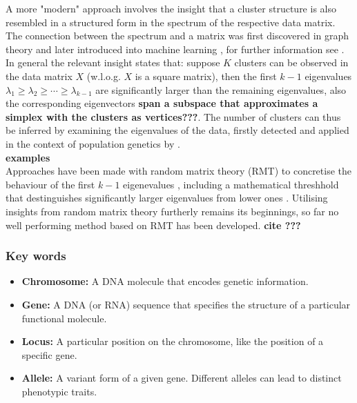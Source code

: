 \documentclass[a4paper, 11pt]{article}
\begin{document}
A more "modern" approach involves the insight that a cluster structure is also resembled in a structured form in the spectrum of the respective data matrix. The connection between the spectrum and a matrix was first discovered in graph theory \cite{donath1973lower} \cite{fiedler1973algebraic} and later introduced into machine learning \cite{shi2000normalized} \cite{meila2001random} \cite{ng2002spectral}, for further information see \cite{von2007tutorial}. In general the relevant insight states that: suppose $K$ clusters can be observed in the data matrix $X$ (w.l.o.g. $X$ is a square matrix), then the first $k-1$ eigenvalues $\lambda_1 \geq \lambda_2 \geq \cdots \geq \lambda_{k-1}$ are significantly larger than the remaining eigenvalues, also the corresponding eigenvectors \textbf{span a subspace that approximates a simplex with the clusters as vertices???}. The number of clusters can thus be inferred by examining the eigenvalues of the data, firstly detected and applied in the context of population genetics by \cite{patterson2006population}. 
\\
\textbf{examples}
\\
Approaches have been made with random matrix theory (RMT) to concretise the behaviour of the first $k-1$ eigenevalues \cite{patterson2006population}, including a mathematical threshhold that destinguishes significantly larger eigenvalues from lower ones \cite {bryc2013separation}. Utilising insights from random matrix theory furtherly remains its beginnings, so far no well performing method based on RMT has been developed. \textbf{cite ???}

\subsubsection{Key words}

\begin{itemize}
\item \textbf{Chromosome:} A DNA molecule that encodes genetic information.

\item \textbf{Gene:} A DNA (or RNA) sequence that specifies the structure of a particular functional molecule.

\item \textbf{Locus:} A particular position on the chromosome, like the position of a specific gene.

\item \textbf{Allele:} A variant form of a given gene. Different alleles can lead to distinct phenotypic traits.

\end{itemize}
\end{document}
